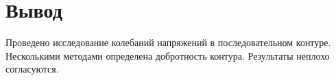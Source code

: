 \section{Вывод}
Проведено исследование колебаний напряжений в последовательном контуре. Несколькими методами определена добротность контура. Результаты неплохо согласуются.
